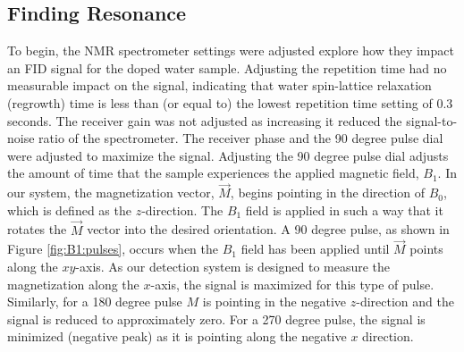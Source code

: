 \subsection{Finding Resonance} \label{B1}

To begin, the NMR spectrometer settings were adjusted explore how they impact an FID signal for the doped water sample. Adjusting the repetition time had no measurable impact on the signal, indicating that water spin-lattice relaxation (regrowth) time is less than (or equal to) the lowest repetition time setting of 0.3 seconds. The receiver gain was not adjusted as increasing it reduced the signal-to-noise ratio of the spectrometer. The receiver phase and the 90 degree pulse dial were adjusted to maximize the signal. Adjusting the 90 degree pulse dial adjusts the amount of time that the sample experiences the applied magnetic field, $B_1$. In our system, the magnetization vector, $\vec{M}$, begins pointing in the direction of $B_0$, which is defined as the $z$-direction. The $B_1$ field is applied in such a way that it rotates the $\vec{M}$ vector into the desired orientation. A 90 degree pulse, as shown in Figure \ref{fig:B1:pulses}, occurs when the $B_1$ field has been applied until $\vec{M}$ points along the $xy$-axis. As our detection system is designed to measure the magnetization along the $x$-axis, the signal is maximized for this type of pulse. \\

Similarly, for a 180 degree pulse $M$ is pointing in the negative $z$-direction and the signal is reduced to approximately zero. For a 270 degree pulse, the signal is minimized (negative peak) as it is pointing along the negative $x$ direction.\\


